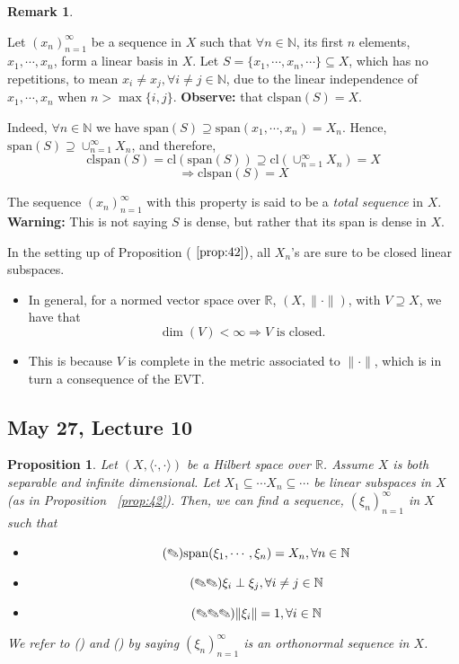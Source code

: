 \documentclass[11pt]{amsart}
\newtheorem{proposition}[theorem]{Proposition}
\theoremstyle{definition}
\newtheorem{remark}[theorem]{Remark}
\numberwithin{equation}{section}
\newcommand{\bN}{ \mathbb{N} }	%
\newcommand{\bR}{ \mathbb{R} }	%
\newcommand{\ips}{ \left( X, \langle \cdot, \cdot \rangle \right) }		%
\newcommand{\nvs}{\left(X, \| \cdot \| \right)}					%
\newcommand{ \sspan }{ \mbox{span} }						%
\newcommand{ \clspan }{ \mbox{clspan} }						%
\newcommand{ \seq }{ (x_n)_{n=1}^\infty }						%
\newcommand{ \cl }{ \mbox{cl} }							%
\newcommand{ \incrchn }{ X_1 \subseteq \cdots X_n \subseteq \cdots } %
\newcommand{ \onseq }{(\xi_n)^\infty_{n=1}} 					%
\begin{document}
\begin{remark}\label{rem:43}

Let $(x_n)_{n=1}^\infty$ be a sequence in $X$ such that $\forall n \in \bN$, its first $n$ elements, $x_1, \cdots, x_n$, form a linear basis in $X$. 
Let $S = \{x_1, \cdots, x_n, \cdots\} \subseteq X$, which has no repetitions, to mean $x_i \not = x_j, \forall i \not = j \in \bN$, due to the linear independence of $x_1, \cdots, x_n$ when $n > \max\{i,j\}$. \textbf{Observe:} that $\clspan(S) = X$. 

\vspace{4pt}

Indeed, $\forall n \in \bN$ we have $\sspan(S) \supseteq \sspan(x_1, \cdots, x_n) = X_n$. Hence, $\sspan(S) \supseteq \cup_{n=1}^\infty X_n$, and therefore, 
\[ \clspan(S) = \mbox{cl}(\sspan(S)) \supseteq \cl(\cup_{n=1}^\infty X_n) = X \]
\[\Rightarrow \clspan(S) = X \]

The sequence $\seq$ with this property is said to be a \textit{total sequence} in $X$. \\
\noindent \textbf{Warning:} This is not saying $S$ is dense, but rather that its span is dense in $X$. 

\vspace{6pt}

In the setting up of Proposition ($~\ref{prop:42})$, all $X_n$'s are sure to be closed linear subspaces. 
\begin{itemize}[ label= $\rightarrow$]
\item In general, for a normed vector space over $\bR$, $\nvs$, with $V \supseteq X$, we have that \[\dim(V) < \infty \Rightarrow V \mbox{ is closed. } \]
\item This is because $V$ is complete in the metric associated to $\| \cdot \|$, which is in turn a consequence of the EVT. 
\end{itemize}
\end{remark}

\vspace{6pt}

\subsection{May 27, Lecture 10}

\begin{proposition} \label{prop:44}
Let $\ips$ be a Hilbert space over $\bR$. Assume $X$ is both separable and infinite dimensional. Let $\incrchn$ be linear subspaces in $X$ (as in Proposition ~\ref{prop:42}). Then, we can find a sequence, $(\xi_n)^\infty_{n=1}$ in $X$ such that 
\begin{itemize}[label={}]
\item \[ \tag{\ding{46}} \sspan(\xi_1, \cdots, \xi_n) = X_n, \forall n \in \bN \]
\item \[\tag{\ding{46}\ding{46}} \xi_i \perp \xi_j, \forall i \not = j \in \bN	\]
\item	\[\tag{\ding{46}\ding{46}\ding{46}} \|\xi_i\| = 1, \forall i \in \bN \]
\end{itemize}
We refer to () and () by saying $\onseq$ is an orthonormal sequence in $X$. 
\end{proposition}
\end{document}
